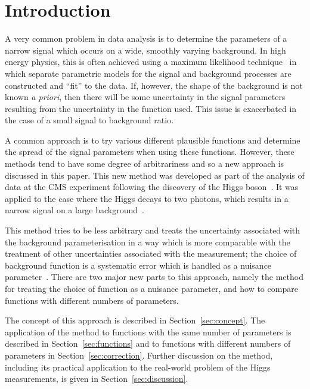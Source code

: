\section{Introduction} %
\label{sec:introduction}

A very common problem in data analysis is to determine the parameters of
a narrow signal which occurs on a wide, smoothly varying background. 
In high energy physics, this is often achieved using a maximum likelihood technique~\cite{ref:Fisher01011922} 
in which separate parametric models for the signal and background processes are constructed and 
``fit'' to the data.
If, however, the shape of the background is not known {\it a priori}, then there will be 
some uncertainty in the signal parameters resulting from the uncertainty in
the function used. This issue is exacerbated in the case of a small signal to
background ratio.

A common approach is to try various different plausible functions and 
determine the spread of the signal parameters when using these functions.
However, these methods tend to have some degree of arbitrariness and so
a new approach is discussed in this paper.
This new method was developed as part of the analysis of data at the CMS experiment
following the discovery of the Higgs
boson~\cite{ref:introduction:atlasdis,ref:introduction:cmsdis}.
It was applied to the case where the Higgs decays to two photons, which
results in a narrow signal on a large 
background~\cite{ref:introduction:legacy}.

This method tries to be less 
arbitrary and treats the uncertainty associated with the
background parameterisation in a way
which is more comparable with the treatment of other 
uncertainties associated with the measurement; the choice of background function 
is a systematic error which is handled as a nuisance parameter~\cite{ref:intro:nusiances}.
There are two major new parts to this approach, namely the method for
treating the choice of function as a nuisance parameter, and how to compare 
functions with different numbers of parameters.

The concept of this approach is described in Section~\ref{sec:concept}.
The application of the method to functions with the same number of parameters
is described in Section~\ref{sec:functions} and to functions with different
numbers of parameters in Section~\ref{sec:correction}. Further discussion on
the method, including its practical application to the real-world problem of
the Higgs measurements, is given in Section~\ref{sec:discussion}.

